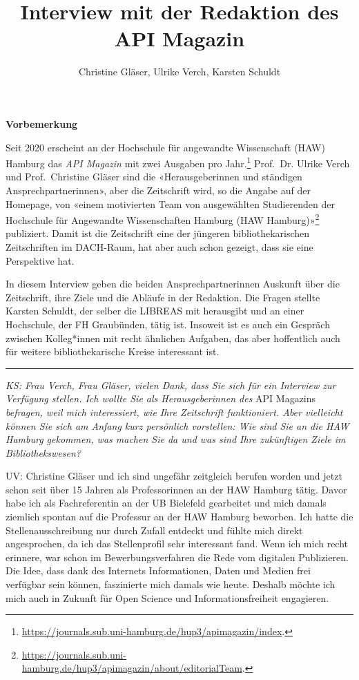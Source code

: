 \documentclass[a4paper,
fontsize=11pt,
oneside,
numbers=noperiodatend,
parskip=half-,
bibliography=totoc,
final
]{scrartcl}
\title{\LARGE{Interview mit der Redaktion des API Magazin}}%
\author{Christine Gläser, Ulrike Verch, Karsten Schuldt} %
\date{}
\begin{document}
\maketitle
\thispagestyle{fancyplain} 


\textbf{Vorbemerkung}

Seit 2020 erscheint an der Hochschule für angewandte Wissenschaft (HAW)
Hamburg das \emph{API Magazin} mit zwei Ausgaben pro Jahr.\footnote{\url{https://journals.sub.uni-hamburg.de/hup3/apimagazin/index}.}
Prof.~Dr. Ulrike Verch und Prof.~Christine Gläser sind die
«Herausgeberinnen und ständigen Ansprechpartnerinnen», aber die
Zeitschrift wird, so die Angabe auf der Homepage, von «einem motivierten
Team von ausgewählten Studierenden der Hochschule für Angewandte
Wissenschaften Hamburg (HAW Hamburg)»\footnote{\url{https://journals.sub.uni-hamburg.de/hup3/apimagazin/about/editorialTeam}.}
publiziert. Damit ist die Zeitschrift eine der jüngeren
bibliothekarischen Zeitschriften im DACH-Raum, hat aber auch schon
gezeigt, dass sie eine Perspektive hat.

In diesem Interview geben die beiden Ansprechpartnerinnen Auskunft über
die Zeitschrift, ihre Ziele und die Abläufe in der Redaktion. Die Fragen
stellte Karsten Schuldt, der selber die LIBREAS mit herausgibt und an
einer Hochschule, der FH Graubünden, tätig ist. Insoweit ist es auch ein
Gespräch zwischen Kolleg*innen mit recht ähnlichen Aufgaben, das aber
hoffentlich auch für weitere bibliothekarische Kreise interessant ist.

\begin{center}\rule{0.5\linewidth}{0.5pt}\end{center}

\emph{KS: Frau Verch, Frau Gläser, vielen Dank, dass Sie sich für ein
Interview zur Verfügung stellen. Ich wollte Sie als Herausgeberinnen
des} API Magazins \emph{befragen, weil mich interessiert, wie Ihre
Zeitschrift funktioniert. Aber vielleicht können Sie sich am Anfang kurz
persönlich vorstellen: Wie sind Sie an die HAW Hamburg gekommen, was
machen Sie da und was sind Ihre zukünftigen Ziele im Bibliothekswesen?}

UV: Christine Gläser und ich sind ungefähr zeitgleich berufen worden und
jetzt schon seit über 15 Jahren als Professorinnen an der HAW Hamburg
tätig. Davor habe ich als Fachreferentin an der UB Bielefeld gearbeitet
und mich damals ziemlich spontan auf die Professur an der HAW Hamburg
beworben. Ich hatte die Stellenausschreibung nur durch Zufall entdeckt
und fühlte mich direkt angesprochen, da ich das Stellenprofil sehr
interessant fand. Wenn ich mich recht erinnere, war schon im
Bewerbungsverfahren die Rede vom digitalen Publizieren. Die Idee, dass
dank des Internets Informationen, Daten und Medien frei verfügbar sein
können, faszinierte mich damals wie heute. Deshalb möchte ich mich auch
in Zukunft für Open Science und Informationsfreiheit engagieren.
\end{document}
